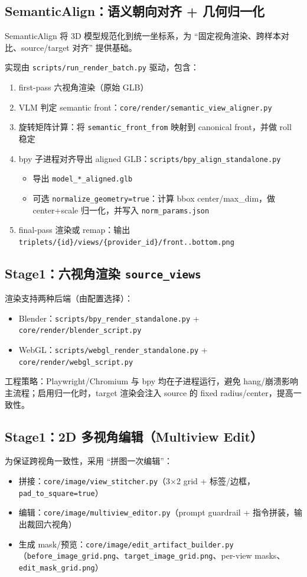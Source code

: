 \documentclass[UTF8,a4paper,11pt]{ctexart}
\begin{document}
\subsection{SemanticAlign：语义朝向对齐 + 几何归一化}\label{sec:semanticalign}
SemanticAlign 将 3D 模型规范化到统一坐标系，为 ``固定视角渲染、跨样本对比、source/target 对齐'' 提供基础。

实现由 \texttt{scripts/run\_render\_batch.py} 驱动，包含：
\begin{enumerate}
  \item first-pass 六视角渲染（原始 GLB）
  \item VLM 判定 semantic front：\texttt{core/render/semantic\_view\_aligner.py}
  \item 旋转矩阵计算：将 \texttt{semantic\_front\_from} 映射到 canonical front，并做 roll 稳定
  \item bpy 子进程对齐导出 aligned GLB：\texttt{scripts/bpy\_align\_standalone.py}
  \begin{itemize}
    \item 导出 \texttt{model\_*\_aligned.glb}
    \item 可选 \texttt{normalize\_geometry=true}：计算 bbox center/max\_dim，做 center+scale 归一化，并写入 \texttt{norm\_params.json}
  \end{itemize}
  \item final-pass 渲染或 remap：输出 \texttt{triplets/\{id\}/views/\{provider\_id\}/front..bottom.png}
\end{enumerate}

\subsection{Stage1：六视角渲染 \texttt{source\_views}}
渲染支持两种后端（由配置选择）：
\begin{itemize}
  \item Blender：\texttt{scripts/bpy\_render\_standalone.py} + \texttt{core/render/blender\_script.py}
  \item WebGL：\texttt{scripts/webgl\_render\_standalone.py} + \texttt{core/render/webgl\_script.py}
\end{itemize}
工程策略：Playwright/Chromium 与 bpy 均在子进程运行，避免 hang/崩溃影响主流程；启用归一化时，target 渲染会注入 source 的 fixed radius/center，提高一致性。

\subsection{Stage1：2D 多视角编辑（Multiview Edit）}
为保证跨视角一致性，采用 ``拼图一次编辑''：
\begin{itemize}
  \item 拼接：\texttt{core/image/view\_stitcher.py}（3$\times$2 grid + 标签/边框，\texttt{pad\_to\_square=true}）
  \item 编辑：\texttt{core/image/multiview\_editor.py}（prompt guardrail + 指令拼装，输出裁回六视角）
  \item 生成 mask/预览：\texttt{core/image/edit\_artifact\_builder.py}（\texttt{before\_image\_grid.png}、\texttt{target\_image\_grid.png}、per-view masks、\texttt{edit\_mask\_grid.png}）
\end{itemize}
\end{document}

